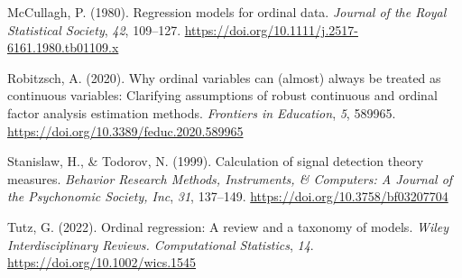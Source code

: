 \documentclass[
  man,floatsintext]{apa6}
\newlength{\cslhangindent}
\newenvironment{CSLReferences}[2] %
 {\begin{list}{}{%
  \setlength{\itemindent}{0pt}
  \setlength{\leftmargin}{0pt}
  \setlength{\parsep}{0pt}
  \ifodd #1
   \setlength{\leftmargin}{\cslhangindent}
   \setlength{\itemindent}{-1\cslhangindent}
  \fi
  \setlength{\itemsep}{#2\baselineskip}}}
 {\end{list}}
\begin{document}
\begin{CSLReferences}{1}{0}
McCullagh, P. (1980). Regression models for ordinal data. \emph{Journal of the Royal Statistical Society}, \emph{42}, 109--127. \url{https://doi.org/10.1111/j.2517-6161.1980.tb01109.x}

Robitzsch, A. (2020). Why ordinal variables can (almost) always be treated as continuous variables: Clarifying assumptions of robust continuous and ordinal factor analysis estimation methods. \emph{Frontiers in Education}, \emph{5}, 589965. \url{https://doi.org/10.3389/feduc.2020.589965}

Stanislaw, H., \& Todorov, N. (1999). Calculation of signal detection theory measures. \emph{Behavior Research Methods, Instruments, \& Computers: A Journal of the Psychonomic Society, Inc}, \emph{31}, 137--149. \url{https://doi.org/10.3758/bf03207704}

Tutz, G. (2022). Ordinal regression: A review and a taxonomy of models. \emph{Wiley Interdisciplinary Reviews. Computational Statistics}, \emph{14}. \url{https://doi.org/10.1002/wics.1545}

\end{CSLReferences}
\end{document}
